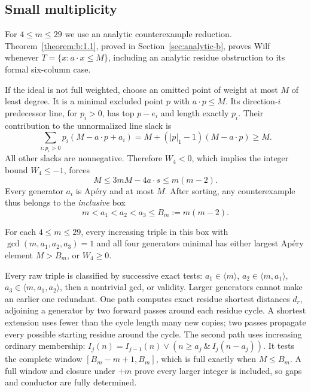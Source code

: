 \subsection{Small multiplicity}\label{sec:p6}

For \(4\le m\le29\) we use an analytic counterexample reduction.
Theorem~\ref{theorem:b:1.1}, proved in Section~\ref{sec:analytic-b},
proves Wilf whenever \(T=\{x:a\cdot x\le M\}\), including an analytic
residue obstruction to its formal six-column case.

If the ideal is not full weighted, choose an omitted point of weight
at most \(M\) of least degree. It is a minimal excluded point \(p\)
with \(a\cdot p\le M\). Its direction-\(i\) predecessor line, for \(p_i>0\),
has top \(p-e_i\) and length exactly \(p_i\).
Their contribution to the unnormalized line slack is
\[
\sum_{i:p_i>0}p_i(M-a\cdot p+a_i)
=M+(|p|_1-1)(M-a\cdot p)\ge M.
\]
All other slacks are nonnegative. Therefore \(W_4<0\), which implies
the integer bound \(W_4\le-1\), forces
\begin{equation}
\boxed{M\le3mM-4a\cdot s\le m(m-2).}
\label{eq:p:16}
\end{equation}
Every generator \(a_i\) is Apéry and at most \(M\).
After sorting, any counterexample thus belongs to the \emph{inclusive} box
\[
m<a_1<a_2<a_3\le B_m:=m(m-2).
\]

\begin{finitelemma}\label{finite:generator-box}
For each \(4\le m\le29\), every increasing
triple in this box with \(\gcd(m,a_1,a_2,a_3)=1\) and all four generators
minimal has either largest Apéry element \(M>B_m\), or \(W_4\ge0\).

\end{finitelemma}

Every raw triple is classified by successive exact tests:
\(a_1\in\langle m\rangle\), \(a_2\in\langle m,a_1\rangle\),
\(a_3\in\langle m,a_1,a_2\rangle\), then a nontrivial gcd, or validity.
Larger generators cannot make an earlier one redundant.
One path computes exact residue shortest distances \(d_r\), adjoining
a generator by two forward passes around each residue cycle.
A shortest extension uses fewer than the cycle length many new copies;
two passes propagate every possible starting residue around the cycle.
The second path uses increasing ordinary membership:
\(I_j(n)=I_{j-1}(n)\vee(n\ge a_j\ \&\ I_j(n-a_j))\).
It tests the complete window \([B_m-m+1,B_m]\), which is full exactly
when \(M\le B_m\). A full window and closure under \(+m\) prove every
larger integer is included, so gaps and conductor are fully determined.

